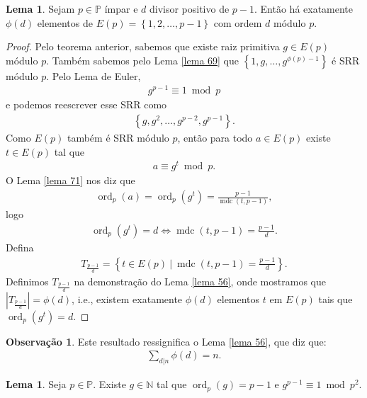 \documentclass[a4paper,11pt,twoside, leqno]{article}
\DeclareMathOperator{\mdc}{mdc}
\DeclareMathOperator{\Ord}{ord}
\theoremstyle{definition}
\newtheorem{lemma}[theorem]{Lema}
\newtheorem{remark}{Observação}[section]
\begin{document}
\begin{lemma}
	\label{lema 75}
	Sejam $p\in\mathbb{P}$ ímpar e $d$ divisor positivo de $p-1$. Então há exatamente $\phi(d)$ elementos de $E(p) = \left\{ 1,2,\dots,p-1 \right\}$ com ordem $d$ módulo $p$.
\end{lemma}
\begin{proof}
	Pelo teorema anterior, sabemos que existe raiz primitiva $g\in E(p)$ módulo $p$. Também sabemos pelo Lema \eqref{lema 69} que $\left\{ 1,g,\dots,g^{\phi(p) - 1} \right\}$ é SRR módulo $p$. Pelo Lema de Euler, 
	\begin{align*}
	g^{p-1}\equiv 1\bmod p
	\end{align*}
	e podemos reescrever esse SRR como
	\begin{align*}
	\left\{ g,g^2,\dots,g^{p-2}, g^{p-1} \right\}.
	\end{align*}
	Como $E(p)$ também é SRR módulo $p$, então para todo $a\in E(p)$ existe $t\in E(p)$ tal que
	\begin{align*}
	a\equiv g^t\bmod p.
	\end{align*}
	O Lema \eqref{lema 71} nos diz que
	\begin{align*}
	\Ord_p(a) = \Ord_p(g^t) = \frac{p-1}{\mdc(t,p-1)},
	\end{align*}
	logo 
	\begin{align*}
	\Ord_p(g^t) = d\Leftrightarrow \mdc(t,p-1) = \frac{p-1}{d}.
	\end{align*}
	Defina
	\begin{align*}
	T_{\frac{p-1}{d}} = \left\{ t\in E(p)\ | \ \mdc(t,p-1) = \frac{p-1}{d} \right\}.
	\end{align*}
	Definimos $\displaystyle{ T_{\frac{p-1}{d}} }$ na demonstração do Lema \eqref{lema 56}, onde mostramos que $\displaystyle{ \left| T_{\frac{p-1}{d}} \right| } = \phi(d)$, i.e., existem exatamente $\phi(d)$ elementos $t$ em $E(p)$ tais que $\Ord_p(g^t) = d$.
\end{proof}
\begin{remark}
	Este resultado ressignifica o Lema \eqref{lema 56}, que diz que:
	\begin{align*}
	\sum_{d|n}\phi(d) = n.
	\end{align*}
\end{remark}
\begin{lemma}
	\label{lema 76}
	Seja $p\in\mathbb{P}$. Existe $g\in\mathbb{N}$ tal que $\Ord_p(g) = p-1$ e $g^{p-1}\equiv 1\bmod p^2$.
\end{lemma}
\end{document}
